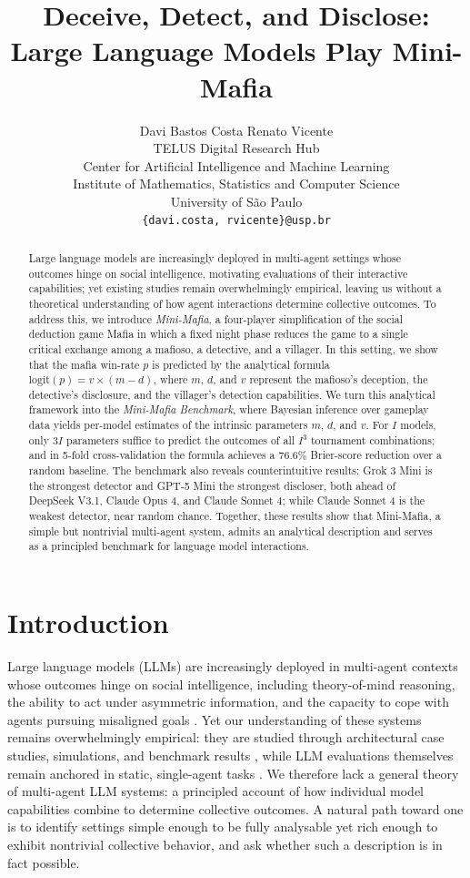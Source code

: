 \documentclass{article}
\title{Deceive, Detect, and Disclose: \\ Large Language Models Play Mini-Mafia}
\author{
  Davi Bastos Costa \quad Renato Vicente \\
  TELUS Digital Research Hub \\
  Center for Artificial Intelligence and Machine Learning \\
  Institute of Mathematics, Statistics and Computer Science\\ 
  University of S\~ao Paulo \\
  \texttt{\{davi.costa, rvicente\}@usp.br}
}
\begin{document}
\maketitle


\begin{abstract}
    Large language models are increasingly deployed in multi-agent settings whose outcomes hinge on social intelligence, motivating evaluations of their interactive capabilities; yet existing studies remain overwhelmingly empirical, leaving us without a theoretical understanding of how agent interactions determine collective outcomes. To address this, we introduce \textit{Mini-Mafia}, a four-player simplification of the social deduction game Mafia in which a fixed night phase reduces the game to a single critical exchange among a mafioso, a detective, and a villager. In this setting, we show that the mafia win-rate $p$ is predicted by the analytical formula $\text{logit}(p) = v \times (m - d)$, where $m$, $d$, and $v$ represent the mafioso's deception, the detective's disclosure, and the villager's detection capabilities. We turn this analytical framework into the \textit{Mini-Mafia Benchmark}, where Bayesian inference over gameplay data yields per-model estimates of the intrinsic parameters $m$, $d$, and $v$. For $I$ models, only $3I$ parameters suffice to predict the outcomes of all $I^3$ tournament combinations; and in 5-fold cross-validation the formula achieves a $76.6\%$ Brier-score reduction over a random baseline. The benchmark also reveals counterintuitive results: Grok 3 Mini is the strongest detector and GPT-5 Mini the strongest discloser, both ahead of DeepSeek V3.1, Claude Opus 4, and Claude Sonnet 4; while Claude Sonnet 4 is the weakest detector, near random chance. Together, these results show that Mini-Mafia, a simple but nontrivial multi-agent system, admits an analytical description and serves as a principled benchmark for language model interactions.
\end{abstract}


\section{Introduction}

Large language models (LLMs) are increasingly deployed in multi-agent contexts whose outcomes hinge on social intelligence, including theory-of-mind reasoning, the ability to act under asymmetric information, and the capacity to cope with agents pursuing misaligned goals \citep{gao2024large, guo2024large, wang2024survey}. Yet our understanding of these systems remains overwhelmingly empirical: they are studied through architectural case studies, simulations, and benchmark results \citep{hou2024egosocialarena}, while LLM evaluations themselves remain anchored in static, single-agent tasks \citep{costa2025moralsusceptibilityrobustnesspersona, banerjee2024vulnerability, pan2025benchmarks}. We therefore lack a general theory of multi-agent LLM systems: a principled account of how individual model capabilities combine to determine collective outcomes. A natural path toward one is to identify settings simple enough to be fully analysable yet rich enough to exhibit nontrivial collective behavior, and ask whether such a description is in fact possible.
\end{document}
